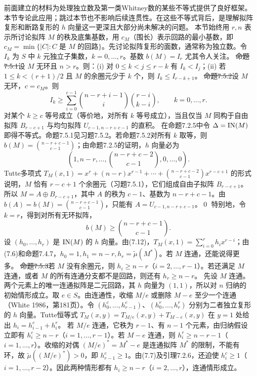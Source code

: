 前面建立的材料为处理独立数及第一类Whitney数的某些不等式提供了良好框架。本节专论此应用；跳过本节也不影响后续连贯性。在这些不等式背后，是理解拟阵复形和断路复形的 $h$ 向量这一更深且大部分尚未解决的问题。
本节始终用 $r,n$ 表示所讨论拟阵 $M$ 的秩及底集基数，用 $c_M$（围长）表示回路的最小基数，即 $c_M=\min\{|C|:C\text{ 是 }M\text{ 的回路}\}$。先讨论拟阵复形的面数，通常称为独立数。令 $I_k$ 为 $S$ 中 $k$ 元独立子集数，$k=0,\ldots,r$。基数 $b(M)=I_r$ 尤其令人关注。
\st{命题7.5.1}设 $M$ 无环且 $n>r$。则：(i) 对 $0\le k<j\le r-k$ 有 $I_k<I_j$；(ii) 若 $1\le k<(r+1)/2$ 且 $M$ 的余圈元少于 $k$ 个，则 $I_k\le I_{r-k+1}$。
\st{命题7.5.2}设 $M$ 无环，$c=c_M$。则
\[I_k\ge\sum_{i=0}^{c-1}\binom{n-r+i-1}{i}\binom{r-i}{k-i},\qquad k=0,\ldots,r.\]
对某个 $k\ge c$ 等号成立（等价地，对所有 $k$ 等号成立），当且仅当 $M$ 同构于自由拟阵 $B_{r-c+1}$ 与均匀拟阵 $U_{c-1,n-r+c-1}$ 的直积。
\pr 在命题7.2.5中令 $\Delta=\operatorname{IN}(M)$ 即得不等式。命题7.5.1见习题7.5.2。若命题7.5.2对所有 $k$ 取等，则 $b(M)=\binom{n-r+c-1}{c-1}$；由命题7.2.5的证明，$h$ 向量必为
\[(1,n-r,\ldots,\binom{n-r+c-2}{c-1},0,\ldots,0).\]
Tutte多项式 $T_M(x,1)=x^r+(n-r)x^{r-1}+\cdots+\binom{n-r+c-2}{c-1}x^{r-c+1}$ 的形式说明，$M$ 恰有 $r-c+1$ 个余圈元（习题7.5.1），它们组成自由子拟阵 $B_{r-c+1}$。所以 $M=A\oplus B_{r-c+1}$，其中 $A$ 的秩为 $c-1$、基数为 $n-r+c-1$。由 $b(A)=b(M)=\binom{n-r+c-1}{c-1}$，只能有 $A=U_{c-1,n-r+c-1}$。\qed
特别地，令 $k=r$，得到对所有无环拟阵，
\[b(M)\ge\binom{n-r+c-1}{c-1}.\tag{7.20}\]
设 $(h_0,\ldots,h_r)$ 是 $\operatorname{IN}(M)$ 的 $h$ 向量。由(7.12)，$T_M(x,1)=\sum_{i=0}^rh_ix^{r-i}$；由(7.6)和命题7.4.7，$h_0=1,h_1=n-r,h_r=\widetilde\mu(M^*)$。若 $M$ 连通，还能说得更多。
\st{命题7.5.3}若 $M$ 没有余圈元，则 $h_i\ge n-r$（$i=2,\ldots,r-1$）。若还满足 $M$ 连通，或者 $M$ 的所有连通分支都不是回路，则还有 $h_r\ge n-r$。
\pr 先设 $M$ 连通。两个元素上的唯一连通拟阵是二元回路，其 $h$ 向量为 $(1,1)$，所以对 $n$ 归纳的初始情形成立。取 $e\in S$。由连通性，收缩 $M/e$ 或删除 $M-e$ 至少一个连通（White 1986，第181页）。令 $(h_0^c,\ldots,h_{r-1}^c)$、$(h_0^r,\ldots,h_r^r)$ 分别为二者独立复形的 $h$ 向量。Tutte恒等式 $T_M(x,y)=T_{M/e}(x,y)+T_{M-e}(x,y)$ 在 $y=1$ 处给出 $h_i=h_{i-1}^c+h_i^r$。
若 $M/e$ 连通，它秩为 $r-1$、有 $n-1$ 个元素，由归纳假设立即有 $h_i^c\ge n-r$（$i=1,\ldots,r-1$）。若 $M-e$ 连通，则 $h_i^r\ge n-r-1$（$i=1,\ldots,r$）。收缩的对偶 $(M/e)^*=M^*-e$ 是连通拟阵 $M^*$ 的限制，不能有环，故 $\widetilde\mu((M/e)^*)>0$，即 $h_{r-1}^c\ge1$。由(7.7)及引理7.2.6，还迫使 $h_i^c\ge1$（$i=1,\ldots,r-2$）。因此两种情形都有 $h_i\ge n-r$（$i=2,\ldots,r$），连通情形成立。
